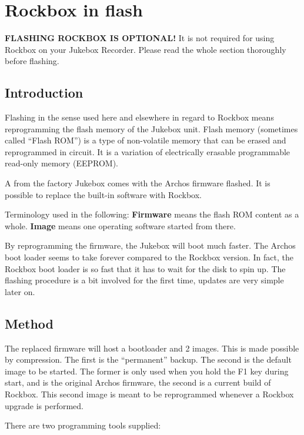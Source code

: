 \section{\label{ref:Rockboxinflash}Rockbox in flash}
\textbf{FLASHING ROCKBOX IS OPTIONAL!} It is not required for using
Rockbox on your Jukebox Recorder. Please read the whole section
thoroughly before flashing.

\subsection{\label{ref:PartISection61}Introduction}
Flashing in the sense used here and elsewhere in regard to Rockbox means
reprogramming the flash memory of the Jukebox unit. Flash memory
(sometimes called ``Flash ROM'') is a type of
non{}-volatile memory that can be erased and reprogrammed in circuit. It is a variation of electrically erasable
programmable read{}-only memory (EEPROM). 

A from the factory Jukebox comes with the Archos firmware flashed. It is
possible to replace the built{}-in software with Rockbox. 

Terminology used in the following:\newline
\textbf{Firmware} means the flash ROM content as a whole.\newline
\textbf{Image} means one operating software started from there. 

By reprogramming the firmware,  the Jukebox will boot much faster. The
Archos boot loader seems to take forever compared to the Rockbox
version. In fact, the Rockbox boot loader is so fast that it has to
wait for the disk to spin up.  The flashing procedure is a bit involved
for the first time, updates are very simple later on. 

\subsection{\label{ref:Method}Method}
The replaced firmware will host a bootloader and 2 images. This is made
possible by compression. The first is the
``permanent'' backup. The second is the
default image to be started.  The former is only used when you hold the
F1 key during start, and is the original Archos firmware, the second is
a current build of Rockbox. This second image is meant to be
reprogrammed whenever a Rockbox upgrade is performed.

There are two programming tools supplied: 

